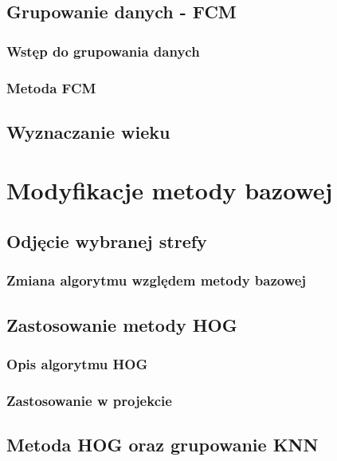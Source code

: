 \documentclass[a4paper,twoside,12pt]{book}
\begin{document}
    \section{Grupowanie danych - FCM}\label{sec:grupowanieDanych}

    \subsection{Wstęp do grupowania danych}
    \subsection{Metoda FCM}

    \section{Wyznaczanie wieku}\label{sec:wyznaczanieWieku}



    \chapter{Modyfikacje metody bazowej}

    \section{Odjęcie wybranej strefy}

    \subsection{Zmiana algorytmu względem metody bazowej}

    \section{Zastosowanie metody HOG}
    \subsection{Opis algorytmu HOG}
    \subsection{Zastosowanie w projekcie}

    \section{Metoda HOG oraz grupowanie KNN}
\end{document}
